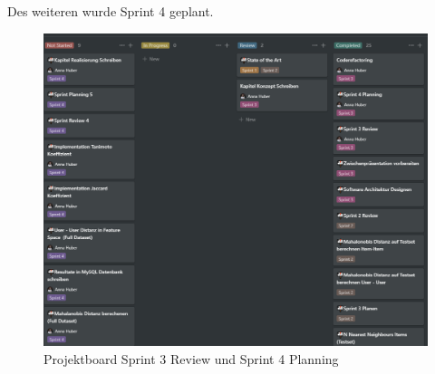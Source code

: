 
Des weiteren wurde Sprint 4 geplant. 
\begin{figure}[htb]
	\centering
	\includegraphics[keepaspectratio,width=\linewidth]{img/Projectboard Sprintreview 3.png}
	\caption{Projektboard Sprint 3 Review und Sprint 4 Planning}
	\label{fig:Sprint 3 Review}
\end{figure}
